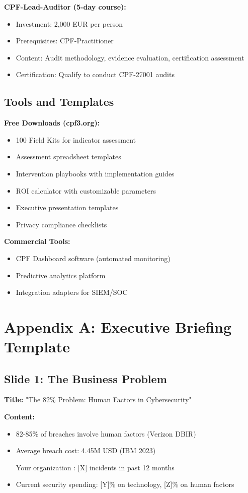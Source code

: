 \documentclass[11pt,a4paper]{article}
\begin{document}
\textbf{CPF-Lead-Auditor (5-day course):}
\begin{itemize}
\item Investment: 2,000 EUR per person
\item Prerequisites: CPF-Practitioner
\item Content: Audit methodology, evidence evaluation, certification assessment
\item Certification: Qualify to conduct CPF-27001 audits
\end{itemize}

\subsection{Tools and Templates}

\textbf{Free Downloads (cpf3.org):}
\begin{itemize}
\item 100 Field Kits for indicator assessment
\item Assessment spreadsheet templates
\item Intervention playbooks with implementation guides
\item ROI calculator with customizable parameters
\item Executive presentation templates
\item Privacy compliance checklists
\end{itemize}

\textbf{Commercial Tools:}
\begin{itemize}
\item CPF Dashboard software (automated monitoring)
\item Predictive analytics platform
\item Integration adapters for SIEM/SOC
\end{itemize}

\appendix

\section{Appendix A: Executive Briefing Template}

\subsection{Slide 1: The Business Problem}

\textbf{Title:} "The 82\% Problem: Human Factors in Cybersecurity"

\textbf{Content:}
\begin{itemize}
\item 82-85\% of breaches involve human factors (Verizon DBIR)
\item Average breach cost: 4.45M USD (IBM 2023)
\item [Your organization]: [X] incidents in past 12 months
\item Current security spending: [Y]\% on technology, [Z]\% on human factors
\end{itemize}
\end{document}
